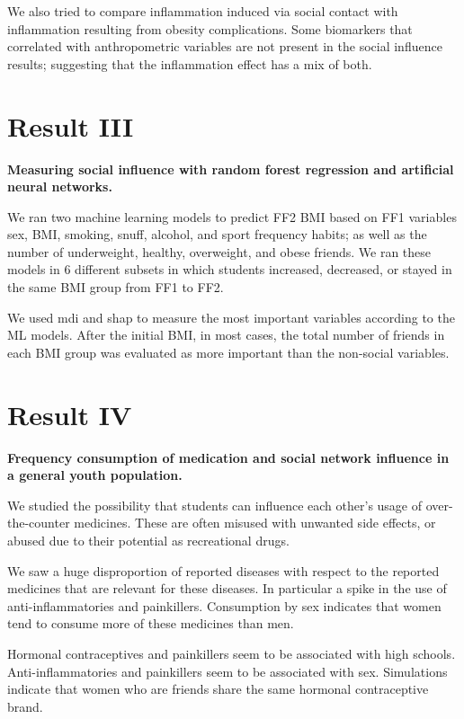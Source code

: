 We also tried to compare inflammation induced via social contact with inflammation resulting from obesity complications. Some biomarkers that correlated with anthropometric variables are not present in the social influence results; suggesting that the inflammation effect has a mix of both.

\section{Result III}

\textbf{Measuring social influence with random forest regression and artificial neural networks.}

We ran two machine learning models to predict FF2 BMI based on FF1 variables sex, BMI, smoking, snuff, alcohol, and sport frequency habits; as well as the number of underweight, healthy, overweight, and obese friends. We ran these models in 6 different subsets in which students increased, decreased, or stayed in the same BMI group from FF1 to FF2.

We used \gls{mdi} and \gls{shap} to measure the most important variables according to the ML models. After the initial BMI, in most cases, the total number of friends in each BMI group was evaluated as more important than the non-social variables.

\section{Result IV}

\textbf{Frequency consumption of medication and social network influence in a general youth population.}

We studied the possibility that students can influence each other's usage of over-the-counter medicines. These are often misused with unwanted side effects, or abused due to their potential as recreational drugs.

\clearpage

We saw a huge disproportion of reported diseases with respect to the reported medicines that are relevant for these diseases. In particular a spike in the use of anti-inflammatories and painkillers. Consumption by sex indicates that women tend to consume more of these medicines than men.

Hormonal contraceptives and painkillers seem to be associated with high schools. Anti-inflammatories and painkillers seem to be associated with sex. Simulations indicate that women who are friends share the same hormonal contraceptive brand.